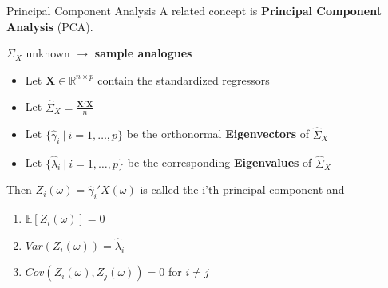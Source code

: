 \documentclass{beamer}
\begin{document}
	\begin{frame}{Principal Component Analysis}
		A related concept is \textbf{Principal Component Analysis} (PCA).
		\vspace{0.2cm}
		
		$\Sigma_X$ unknown $\rightarrow$ \textbf{sample analogues}
		
		\begin{itemize}
			\item Let $\mathbf{X} \in \mathbb{R}^{n \times p}$ contain the standardized regressors
			\item Let $\hat{\Sigma}_X = \frac{\mathbf{X}'\mathbf{X}}{n}$
			\item Let $\{\hat{\gamma}_i \: \vert \: i = 1, \dots, p\}$ be the orthonormal \textbf{Eigenvectors} of $\hat{\Sigma}_X$
			\item Let $\{\hat{\lambda}_i \: \vert \: i = 1, \dots, p\}$ be the corresponding \textbf{Eigenvalues} of $\hat{\Sigma}_X$
		\end{itemize}
		\vspace{0.2cm} 
		
		Then $Z_i(\omega) = \hat{\gamma}_i' X(\omega)$ is called the i'th principal component and
		\begin{multicols}{2}
			\begin{enumerate}
				\item $\mathbb{E}[Z_i(\omega)] = 0$
				\item $Var(Z_i(\omega)) = \hat{\lambda}_i$
				\item $Cov(Z_i(\omega), Z_j(\omega)) = 0$ for $i \neq j$
			\end{enumerate}
		\end{multicols}
	\end{frame}
	
\end{document}
